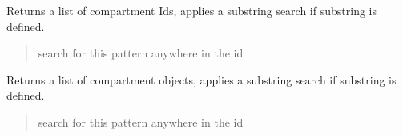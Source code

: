 \documentclass[letterpaper,12pt,english]{sphinxmanual}
\begin{document}
\begin{fulllineitems}
\begin{fulllineitems}
\begin{quote}
\begin{description}
\end{description}\end{quote}

\end{fulllineitems}


\begin{fulllineitems}
\label{\detokenize{api/core:cbmpy.CBModel.Model.getCompartmentIds}}
\pysigstartsignatures
\pysiglinewithargsret
{}
{}
{}
\pysigstopsignatures
\sphinxAtStartPar
Returns a list of compartment Ids, applies a substring search if substring is defined.
\begin{quote}\begin{description}
\sphinxAtStartPar
{} \textendash{} search for this pattern anywhere in the id

\end{description}\end{quote}

\end{fulllineitems}


\begin{fulllineitems}
\label{\detokenize{api/core:cbmpy.CBModel.Model.getCompartmentObjects}}
\pysigstartsignatures
\pysiglinewithargsret
{}
{}
{}
\pysigstopsignatures
\sphinxAtStartPar
Returns a list of compartment objects, applies a substring search if substring is defined.
\begin{quote}\begin{description}
\sphinxAtStartPar
{} \textendash{} search for this pattern anywhere in the id

\end{description}\end{quote}

\end{fulllineitems}


\end{fulllineitems}
\end{document}
